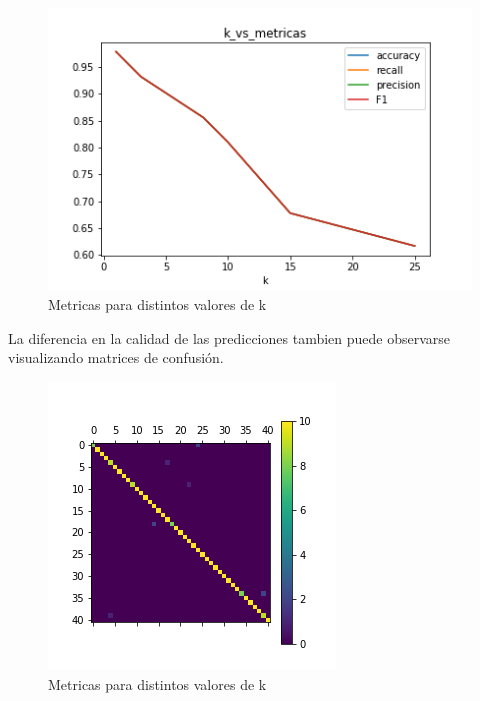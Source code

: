 \begin{figure}[H]
    \begin{center}
      \includegraphics[width=0.8\columnwidth]{imagenes/charuli-des/k_vs_metricas.png}
      \caption{Metricas para distintos valores de k}
    \end{center}
\end{figure}

La diferencia en la calidad de las predicciones tambien puede observarse  visualizando matrices de confusión.

\begin{figure}[H]
    \begin{center}
      \includegraphics[width=0.8\columnwidth]{imagenes/charuli-des/Confusion_matrix_for_k_1.png}
      \caption{Metricas para distintos valores de k}
    \end{center}
\end{figure}

